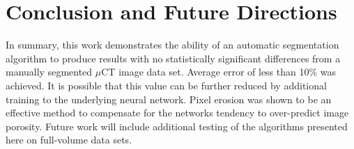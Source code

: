 \documentclass[11pt, twocolumn]{article}
\begin{document}
\section{Conclusion and Future Directions} 

In summary, this work demonstrates the ability of an automatic segmentation algorithm to produce results with no statistically significant differences from a manually segmented $\mu$CT image data set. Average error of less than 10\% was achieved. It is possible that this value can be further reduced by additional training to the underlying neural network. Pixel erosion was shown to be an effective method to compensate for the networks tendency to over-predict image porosity. Future work will include additional testing of the algorithms presented here on full-volume data sets.



\end{document}
